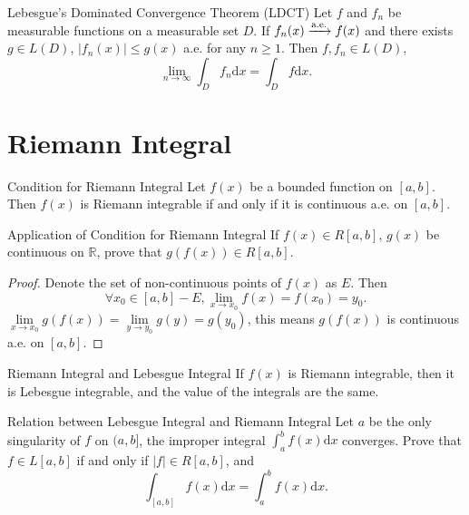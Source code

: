 \begin{theorem}{Lebesgue's Dominated Convergence Theorem (LDCT)}{}
  Let $f$ and $f_n$ be measurable functions on a measurable set $D$.
  If $f_n(x) \xrightarrow{\text{a.e.}} f(x)$ and there exists $g \in L(D)$,
  $|f_n(x)| \leq g(x)$ a.e. for any $n \geq 1$.
  Then $f, f_n \in L(D)$,
  \begin{equation}
    \lim \limits _{n \rightarrow \infty} \int_D f_n\mathrm{d} x
    = \int_D f\mathrm{d}x.
  \end{equation}
\end{theorem}

\section{Riemann Integral}

\begin{theorem}{Condition for Riemann Integral}{}
  Let $f(x)$ be a bounded function on $[a, b]$.
  Then $f(x)$ is Riemann integrable if and only if
  it is continuous a.e. on $[a, b]$.
\end{theorem}

\begin{example}{Application of Condition for Riemann Integral}{}
  If $f(x) \in R[a, b]$, $g(x)$ be continuous on $\mathbb{R}$,
  prove that $g(f(x)) \in R[a, b]$.
\end{example}

\begin{proof}
  Denote the set of non-continuous points of $f(x)$ as $E$.
  Then
  \begin{equation}
    \forall x_0 \in [a, b] - E, \lim \limits _{x \rightarrow x_0} f(x) = f(x_0) = y_0.
  \end{equation}
  $\lim \limits _{x \rightarrow x_0}g(f(x)) = \lim \limits _{y \rightarrow y_0}g(y) = g(y_0)$,
  this means $g(f(x))$ is continuous a.e. on $[a, b]$.
\end{proof}

\begin{theorem}{Riemann Integral and Lebesgue Integral}{}
  If $f(x)$ is Riemann integrable, then it is Lebesgue integrable,
  and the value of the integrals are the same.
\end{theorem}

\begin{example}{Relation between Lebesgue Integral and Riemann Integral}{}
  Let $a$ be the only singularity of $f$ on $(a, b]$,
  the improper integral $\int_a^b f(x)\mathrm{d} x$ converges.
  Prove that $f \in L[a, b]$ if and only if $|f| \in R[a, b]$,
  and 
  \begin{equation}
    \int_{[a,b]} f(x)\mathrm{d} x = \int_a^b f(x)\mathrm{d} x.
  \end{equation}
\end{example}

